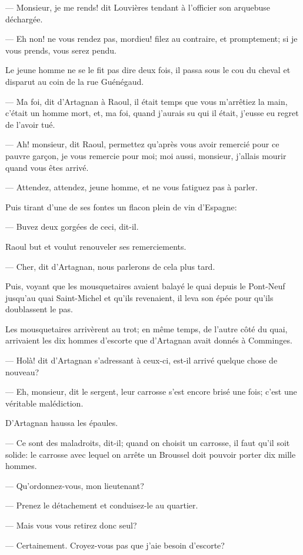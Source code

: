 — Monsieur, je me rends! dit Louvières tendant à l'officier son arquebuse déchargée.

— Eh non! ne vous rendez pas, mordieu! filez au contraire, et promptement; si je vous prends, vous serez pendu.

Le jeune homme ne se le fit pas dire deux fois, il passa sous le cou du cheval et disparut au coin de la rue Guénégaud.

— Ma foi, dit d'Artagnan à Raoul, il était temps que vous m'arrêtiez la main, c'était un homme mort, et, ma foi, quand j'aurais su qui il était, j'eusse eu regret de l'avoir tué.

— Ah! monsieur, dit Raoul, permettez qu'après vous avoir remercié pour ce pauvre garçon, je vous remercie pour moi; moi aussi, monsieur, j'allais mourir quand vous êtes arrivé.

— Attendez, attendez, jeune homme, et ne vous fatiguez pas à parler.

Puis tirant d'une de ses fontes un flacon plein de vin d'Espagne:

— Buvez deux gorgées de ceci, dit-il.

Raoul but et voulut renouveler ses remerciements.

— Cher, dit d'Artagnan, nous parlerons de cela plus tard.

Puis, voyant que les mousquetaires avaient balayé le quai depuis le Pont-Neuf jusqu'au quai Saint-Michel et qu'ils revenaient, il leva son épée pour qu'ils doublassent le pas.

Les mousquetaires arrivèrent au trot; en même temps, de l'autre côté du quai, arrivaient les dix hommes d'escorte que d'Artagnan avait donnés à Comminges.

— Holà! dit d'Artagnan s'adressant à ceux-ci, est-il arrivé quelque chose de nouveau?

— Eh, monsieur, dit le sergent, leur carrosse s'est encore brisé une fois; c'est une véritable malédiction.

D'Artagnan haussa les épaules.

— Ce sont des maladroits, dit-il; quand on choisit un carrosse, il faut qu'il soit solide: le carrosse avec lequel on arrête un Broussel doit pouvoir porter dix mille hommes.

— Qu'ordonnez-vous, mon lieutenant?

— Prenez le détachement et conduisez-le au quartier.

— Mais vous vous retirez donc seul?

— Certainement. Croyez-vous pas que j'aie besoin d'escorte?

